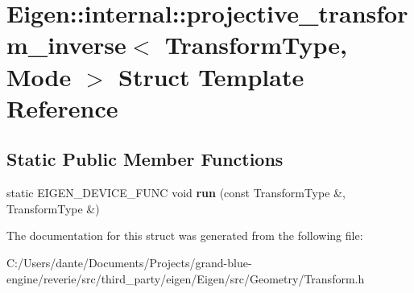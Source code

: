 \hypertarget{struct_eigen_1_1internal_1_1projective__transform__inverse}{}\section{Eigen\+::internal\+::projective\+\_\+transform\+\_\+inverse$<$ Transform\+Type, Mode $>$ Struct Template Reference}
\label{struct_eigen_1_1internal_1_1projective__transform__inverse}
\subsection*{Static Public Member Functions}
\begin{DoxyCompactItemize}
\item 
\mbox{\label{struct_eigen_1_1internal_1_1projective__transform__inverse_adf4ddcf803974e309b1e280c19da56c1}} 
static E\+I\+G\+E\+N\+\_\+\+D\+E\+V\+I\+C\+E\+\_\+\+F\+U\+NC void {\bfseries run} (const Transform\+Type \&, Transform\+Type \&)
\end{DoxyCompactItemize}


The documentation for this struct was generated from the following file\+:\begin{DoxyCompactItemize}
\item 
C\+:/\+Users/dante/\+Documents/\+Projects/grand-\/blue-\/engine/reverie/src/third\+\_\+party/eigen/\+Eigen/src/\+Geometry/Transform.\+h\end{DoxyCompactItemize}
